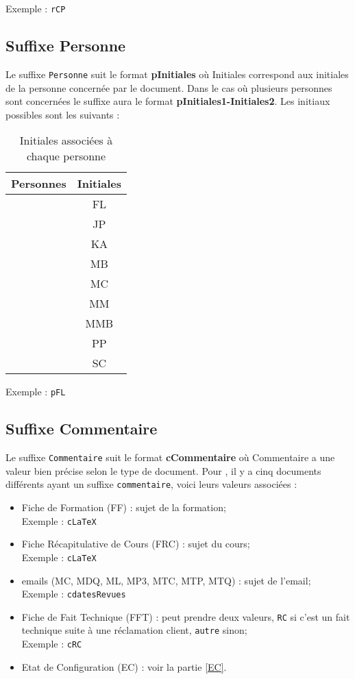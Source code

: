 Exemple : \verb+rCP+

\subsection{Suffixe Personne}
\label{suffixe_personne}

Le suffixe \verb+Personne+ suit le format \textbf{pInitiales} où Initiales correspond aux initiales de la personne concernée par le document. Dans le cas où plusieurs personnes sont concernées le suffixe aura le format \textbf{pInitiales1-Initiales2}. Les initiaux possibles sont les suivants :
\begin{table}[H]
	\centering
	\begin{tabularx}{8cm}{|X|c|}
	\hline
	\rowcolor[gray]{0.85} Personnes & Initiales\\
	\hline
	\Florian & FL \\
	\hline
	\Julie & JP \\
	\hline
	\Kafui & KA \\
	\hline
	\Melissa & MB \\
	\hline
	\Michel & MC \\
	\hline
	\Mathieu & MM \\
	\hline
	\Matthieu & MMB \\
	\hline
	\Pierre & PP \\
	\hline
	\Sergi & SC \\
	\hline
	\end{tabularx}
	\caption{Initiales associées à chaque personne}
	\label{Initiales}
\end{table}

Exemple : \verb+pFL+

\subsection{Suffixe Commentaire}
\label{suffixe_commentaire}

Le suffixe \verb+Commentaire+ suit le format \textbf{cCommentaire} où Commentaire a une valeur bien précise selon le type de document. Pour \nomEquipe, il y a cinq documents différents ayant un suffixe \verb+commentaire+, voici leurs valeurs associées :
\begin{itemize}
\item Fiche de Formation (FF) : sujet de la formation;\\
 Exemple : \verb+cLaTeX+
 \item Fiche Récapitulative de Cours (FRC) : sujet du cours;\\
 Exemple : \verb+cLaTeX+
\item emails (MC, MDQ, ML, MP3, MTC, MTP, MTQ) : sujet de l'email;\\
 Exemple : \verb+cdatesRevues+
\item Fiche de Fait Technique (FFT) : peut prendre deux valeurs, \verb+RC+ si c'est un fait technique suite à une réclamation client, \verb+autre+ sinon;\\
 Exemple : \verb+cRC+
\item Etat de Configuration (EC) : voir la partie \ref{EC}.
\end{itemize}
